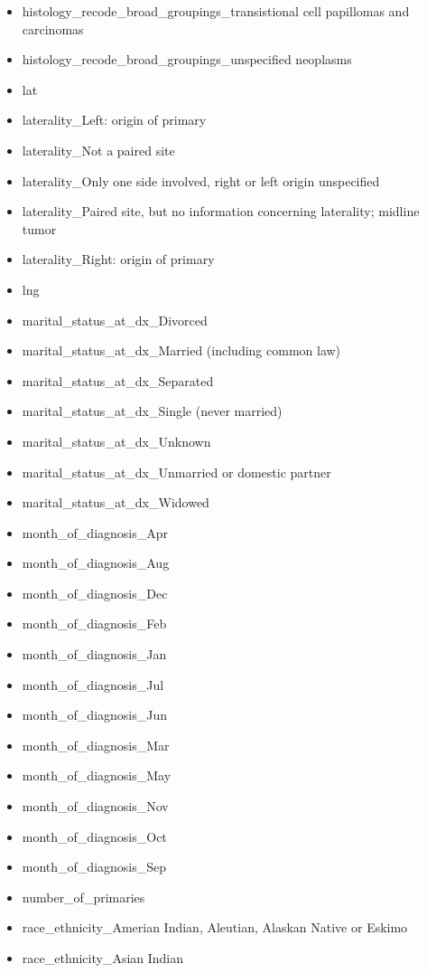 \documentclass[a4paper,11pt]{article}
\begin{document}
\begin{itemize}[noitemsep]
\item histology\_recode\_broad\_groupings\_transistional cell papillomas and carcinomas
\item histology\_recode\_broad\_groupings\_unspecified neoplasms
\item lat
\item laterality\_Left: origin of primary
\item laterality\_Not a paired site
\item laterality\_Only one side involved, right or left origin unspecified
\item laterality\_Paired site, but no information concerning laterality; midline tumor
\item laterality\_Right: origin of primary
\item lng
\item marital\_status\_at\_dx\_Divorced
\item marital\_status\_at\_dx\_Married (including common law)
\item marital\_status\_at\_dx\_Separated
\item marital\_status\_at\_dx\_Single (never married)
\item marital\_status\_at\_dx\_Unknown
\item marital\_status\_at\_dx\_Unmarried or domestic partner
\item marital\_status\_at\_dx\_Widowed
\item month\_of\_diagnosis\_Apr
\item month\_of\_diagnosis\_Aug
\item month\_of\_diagnosis\_Dec
\item month\_of\_diagnosis\_Feb
\item month\_of\_diagnosis\_Jan
\item month\_of\_diagnosis\_Jul
\item month\_of\_diagnosis\_Jun
\item month\_of\_diagnosis\_Mar
\item month\_of\_diagnosis\_May
\item month\_of\_diagnosis\_Nov
\item month\_of\_diagnosis\_Oct
\item month\_of\_diagnosis\_Sep
\item number\_of\_primaries
\item race\_ethnicity\_Amerian Indian, Aleutian, Alaskan Native or Eskimo
\item race\_ethnicity\_Asian Indian

\end{itemize}
\end{document}
